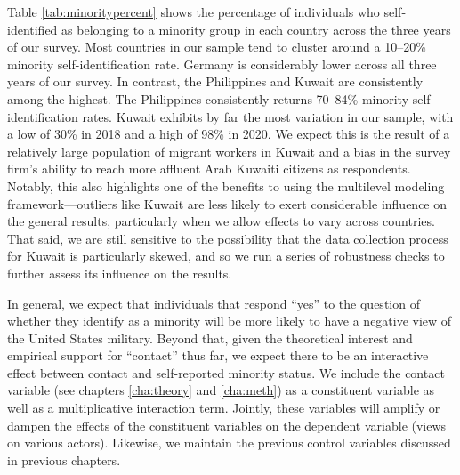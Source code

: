 Table \ref{tab:minoritypercent} shows the percentage of individuals who self-identified as belonging to a minority group in each country across the three years of our survey. Most countries in our sample tend to cluster around a 10--20\% minority self-identification rate. Germany is considerably lower across all three years of our survey. In contrast, the Philippines and Kuwait are consistently among the highest. The Philippines consistently returns 70--84\% minority self-identification rates. Kuwait exhibits by far the most variation in our sample, with a low of 30\% in 2018 and a high of 98\% in 2020. We expect this is the result of a relatively large population of migrant workers in Kuwait and a bias in the survey firm's ability to reach more affluent Arab Kuwaiti citizens as respondents. Notably, this also highlights one of the benefits to using the multilevel modeling framework---outliers like Kuwait are less likely to exert considerable influence on the general results, particularly when we allow effects to vary across countries. That said, we are still sensitive to the possibility that the data collection process for Kuwait is particularly skewed, and so we run a series of robustness checks to further assess its influence on the results.





In general, we expect that individuals that respond ``yes'' to the question of whether they identify as a minority will be more likely to have a negative view of the United States military. Beyond that, given the theoretical interest and empirical support for ``contact'' thus far, we expect there to be an interactive effect between contact and self-reported minority status. We include the contact variable (see chapters \ref{cha:theory} and \ref{cha:meth}) as a constituent variable as well as a multiplicative interaction term. Jointly, these variables will amplify or dampen the effects of the constituent variables on the dependent variable (views on various actors). Likewise, we maintain the previous control variables discussed in previous chapters. 





  






